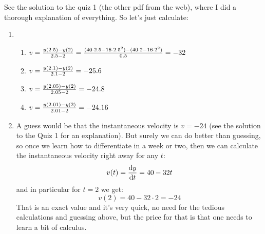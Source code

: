 \documentclass[10pt]{article}
\begin{document}
See the solution to the quiz 1 (the other pdf from the web), where I did a
thorough explanation of everything. So let's just calculate:
\begin{enumerate}
\item
\begin{enumerate}
\item $v={y(2.5)-y(2)\over
2.5-2}={(40\cdot2.5-16\cdot2.5^2)-(40\cdot2-16\cdot2^2)\over 0.5}=-32$
\item $v={y(2.1)-y(2)\over 2.1-2}=-25.6$
\item $v={y(2.05)-y(2)\over 2.05-2}=-24.8$
\item $v={y(2.01)-y(2)\over 2.01-2}=-24.16$
\end{enumerate}
\item A guess would be that the instantaneous velocity is $v=-24$ (see the
solution to the Quiz 1 for an explanation). But surely
we can do better than guessing, so once we learn how to differentiate in a week
or two, then we can calculate the instantaneous velocity right away for any $t$:
$$v(t) = {{\rm d} y\over{\rm d} t} = 40-32t$$
and in particular for $t=2$ we get:
$$v(2) = 40-32\cdot2 = -24$$
That is an exact value and it's very quick, no need for the tedious
calculations and guessing above, but the price for that is that one needs to
learn a bit of calculus.
\end{enumerate}
\end{document}
